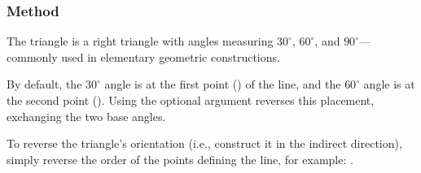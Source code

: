 \vspace{1em}
\begin{minipage}{.5\textwidth}
\begin{center}
\end{center}
\end{minipage}
\begin{minipage}{.5\textwidth}
\begin{tkzexample}
\end{tkzexample}
\end{minipage}

\subsubsection{Method } %
\label{ssub:method_imeth_line_school_swap}

The  triangle is a right triangle with angles measuring $30^\circ$, $60^\circ$, and $90^\circ$—commonly used in elementary geometric constructions.

\medskip
\noindent
By default, the $30^\circ$ angle is at the first point () of the line, and the $60^\circ$ angle is at the second point (). Using the optional argument  reverses this placement, exchanging the two base angles.

\medskip
\noindent
To reverse the triangle’s orientation (i.e., construct it in the indirect direction), simply reverse the order of the points defining the line, for example:  
.

